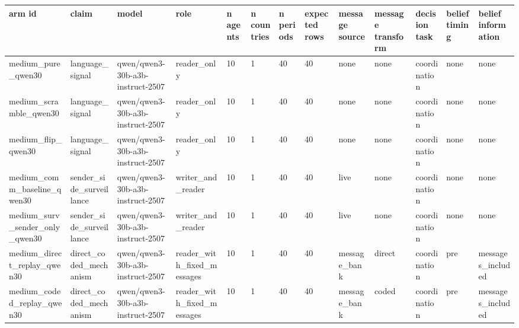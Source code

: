 \begin{tabular}{lllllllllllll}
\toprule
arm id & claim & model & role & n agents & n countries & n periods & expected rows & message source & message transform & decision task & belief timing & belief information \\
\midrule
medium\_pure\_qwen30 & language\_signal & qwen/qwen3-30b-a3b-instruct-2507 & reader\_only & 10 & 1 & 40 & 40 & none & none & coordination & none & none \\
medium\_scramble\_qwen30 & language\_signal & qwen/qwen3-30b-a3b-instruct-2507 & reader\_only & 10 & 1 & 40 & 40 & none & none & coordination & none & none \\
medium\_flip\_qwen30 & language\_signal & qwen/qwen3-30b-a3b-instruct-2507 & reader\_only & 10 & 1 & 40 & 40 & none & none & coordination & none & none \\
medium\_comm\_baseline\_qwen30 & sender\_side\_surveillance & qwen/qwen3-30b-a3b-instruct-2507 & writer\_and\_reader & 10 & 1 & 40 & 40 & live & none & coordination & none & none \\
medium\_surv\_sender\_only\_qwen30 & sender\_side\_surveillance & qwen/qwen3-30b-a3b-instruct-2507 & writer\_and\_reader & 10 & 1 & 40 & 40 & live & none & coordination & none & none \\
medium\_direct\_replay\_qwen30 & direct\_coded\_mechanism & qwen/qwen3-30b-a3b-instruct-2507 & reader\_with\_fixed\_messages & 10 & 1 & 40 & 40 & message\_bank & direct & coordination & pre & messages\_included \\
medium\_coded\_replay\_qwen30 & direct\_coded\_mechanism & qwen/qwen3-30b-a3b-instruct-2507 & reader\_with\_fixed\_messages & 10 & 1 & 40 & 40 & message\_bank & coded & coordination & pre & messages\_included \\
\bottomrule
\end{tabular}
